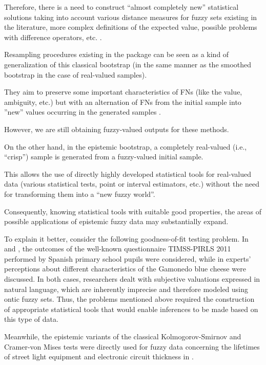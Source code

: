 Therefore, there is a need to construct ``almost completely new'' statistical solutions taking into account various distance measures for fuzzy sets existing in the literature, more complex definitions of the expected value, possible problems with difference operators, etc. \citep{ban_coroianu_pg,HEILPERN199281}.

Resampling procedures existing in the  package can be seen as a kind of generalization of this classical bootstrap (in the same manner as the smoothed bootstrap in the case of real-valued samples).

They aim to preserve some important characteristics of FNs (like the value, ambiguity, etc.) but with an alternation of FNs from the initial sample into ''new'' values occurring in the generated samples \citep{grzegorzewski_amcs2020,GrzegorzewskiRom2021}.

However, we are still obtaining fuzzy-valued outputs for these methods.

On the other hand, in the epistemic bootstrap, a completely real-valued (i.e., ``crisp'') sample is generated from a fuzzy-valued initial sample.

This allows the use of directly highly developed statistical tools for real-valued data (various statistical tests, point or interval estimators, etc.) without the need for transforming them into a ``new fuzzy world''. 

Consequently, knowing statistical tools with suitable good properties, the areas of possible applications of epistemic fuzzy data may substantially expand.

To explain it better, consider the following goodness-of-fit testing problem. In \cite{LUBIANO2016918} and \cite{lubiano2017}, the outcomes of the well-known questionnaire TIMSS-PIRLS 2011 performed by Spanish primary school pupils were considered, while in  \cite{Ramos-Guajardo2019} experts' perceptions about different characteristics of the Gamonedo blue cheese were discussed. In both cases, researchers dealt with subjective valuations expressed in natural language, which are inherently imprecise and therefore modeled using ontic fuzzy sets. Thus, the problems mentioned above required the construction of appropriate statistical tools that would enable inferences to be made based on this type of data.

Meanwhile, the epistemic variants of the classical Kolmogorov-Smirnov and Cramer-von Mises tests were directly used for fuzzy data concerning the lifetimes of street light equipment \citep{Hesamian2013} and electronic circuit thickness \citep{FARAZ20102684} in \cite{PGMR2024AMS}.

